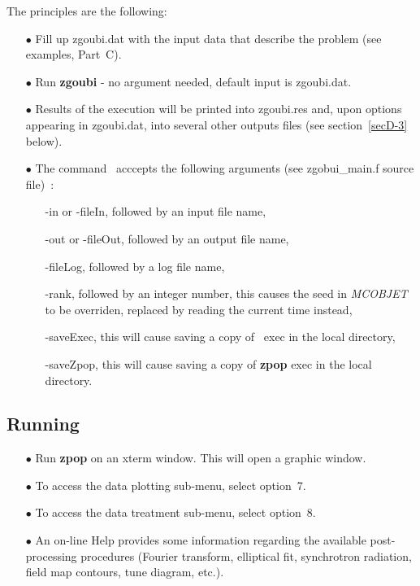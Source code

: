 The principles are the following:
\begin{itemize}
\item[$\bullet$] Fill up zgoubi.dat    with the input data that describe the 
problem (see examples, Part~C). 
\item[$\bullet$] Run  \textbf{zgoubi} - no argument needed, default input is zgoubi.dat. 
\item[$\bullet$] Results of the execution will be printed into  
zgoubi.res  and, upon options appearing in zgoubi.dat,
 into several other outputs files (see section~\ref{secD-3} below).  
\item[$\bullet$] The command \zgou\ acccepts the following arguments (see zgobui\_main.f source file)~: 
\begin{itemize}
\item[] -in or -fileIn, followed by an input file name, 
\item[] -out or -fileOut, followed by an output file name,
\item[] -fileLog, followed by a log file name,
\item[] -rank, followed by an integer number, this causes the seed in \textsl{MCOBJET} to be overriden, replaced by reading the current time instead, 
\item[] -saveExec, this will cause saving a copy of \zgou\ exec in the local directory,
\item[] -saveZpop, this will cause saving a copy of \textbf{zpop} exec in the local directory. 
\end{itemize}
\end{itemize}

\subsection{Running \zpop}  

\begin{itemize}
\item[$\bullet$] Run \textbf{zpop} on an xterm window. This will open a 
graphic window. 
\item[$\bullet$] To access the data plotting sub-menu, select option~7. 
\item[$\bullet$] To access the data treatment sub-menu, select option~8. 
\item[$\bullet$] An on-line Help provides some information 
regarding the available post-processing procedures (Fourier transform, elliptical fit, synchrotron 
radiation, field map contours, tune diagram, etc.).
\end{itemize}

